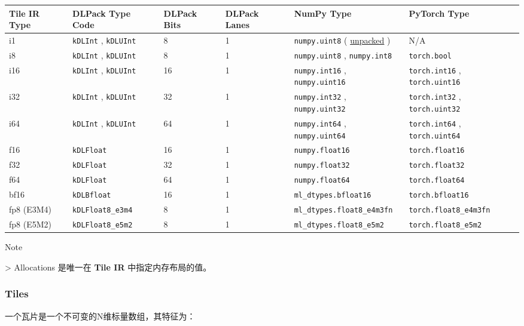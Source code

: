 \documentclass{article}
\begin{document}
\begin{longtable}{l|l|l|l|l|l}
\hline
\textbf{Tile IR} Type & DLPack Type Code & DLPack Bits & DLPack Lanes & NumPy Type & PyTorch Type \\ \hline
i1 & \texttt{kDLInt} , \texttt{kDLUInt} & 8 & 1 & \texttt{numpy.uint8} ( \href{https://numpy.org/devdocs/reference/generated/numpy.packbits.html}{unpacked} ) & N/A \\ \hline
i8 & \texttt{kDLInt} , \texttt{kDLUInt} & 8 & 1 & \texttt{numpy.uint8} , \texttt{numpy.int8} & \texttt{torch.bool} \\ \hline
i16 & \texttt{kDLInt} , \texttt{kDLUInt} & 16 & 1 & \texttt{numpy.int16} , \texttt{numpy.uint16} & \texttt{torch.int16} , \texttt{torch.uint16} \\ \hline
i32 & \texttt{kDLInt} , \texttt{kDLUInt} & 32 & 1 & \texttt{numpy.int32} , \texttt{numpy.uint32} & \texttt{torch.int32} , \texttt{torch.uint32} \\ \hline
i64 & \texttt{kDLInt} , \texttt{kDLUInt} & 64 & 1 & \texttt{numpy.int64} , \texttt{numpy.uint64} & \texttt{torch.int64} , \texttt{torch.uint64} \\ \hline
f16 & \texttt{kDLFloat} & 16 & 1 & \texttt{numpy.float16} & \texttt{torch.float16} \\ \hline
f32 & \texttt{kDLFloat} & 32 & 1 & \texttt{numpy.float32} & \texttt{torch.float32} \\ \hline
f64 & \texttt{kDLFloat} & 64 & 1 & \texttt{numpy.float64} & \texttt{torch.float64} \\ \hline
bf16 & \texttt{kDLBfloat} & 16 & 1 & \texttt{ml\_dtypes.bfloat16} & \texttt{torch.bfloat16} \\ \hline
fp8 (E3M4) & \texttt{kDLFloat8\_e3m4} & 8 & 1 & \texttt{ml\_dtypes.float8\_e4m3fn} & \texttt{torch.float8\_e4m3fn} \\ \hline
fp8 (E5M2) & \texttt{kDLFloat8\_e5m2} & 8 & 1 & \texttt{ml\_dtypes.float8\_e5m2} & \texttt{torch.float8\_e5m2} \\ \hline
\end{longtable}


Note

> Allocations 是唯一在 \textbf{Tile IR} 中指定内存布局的值。




\subsubsection{Tiles}

一个瓦片是一个不可变的N维标量数组，其特征为：
\end{document}
